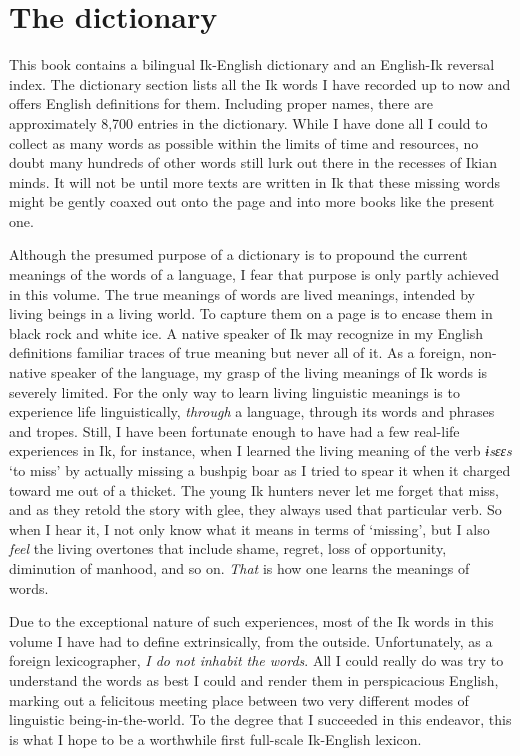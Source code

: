  
\section{The dictionary}\label{sec:1.2} 

This book contains a bilingual Ik-English dictionary and an English-Ik reversal index. The dictionary section lists all the Ik words I have recorded up to now and offers English definitions for them. Including proper names, there are approximately 8,700 entries in the dictionary. While I have done all I could to collect as many words as possible within the limits of time and resources, no doubt many hundreds of other words still lurk out there in the recesses of Ikian minds. It will not be until more texts are written in Ik that these missing words might be gently coaxed out onto the page and into more books like the present one. 

Although the presumed purpose of a dictionary is to propound the current meanings of the words of a language, I fear that purpose is only partly achieved in this volume. The true meanings of words are lived meanings, intended by living beings in a living world. To capture them on a page is to encase them in black rock and white ice. A native speaker of Ik may recognize in my English definitions familiar traces of true meaning but never all of it. As a foreign, non-native speaker of the language, my grasp of the living meanings of Ik words is severely limited. For the only way to learn living linguistic meanings is to experience life linguistically, \textit{through} a language, through its words and phrases and tropes. Still, I have been fortunate enough to have had a few real-life experiences in Ik, for instance, when I learned the living meaning of the verb \textit{ɨsɛɛs }‘to miss’ by actually missing a bushpig boar as I tried to spear it when it charged toward me out of a thicket. The young Ik hunters never let me forget that miss, and as they retold the story with glee, they always used that particular verb. So when I hear it, I not only know what it means in terms of ‘missing’, but I also \textit{feel} the living overtones that include shame, regret, loss of opportunity, diminution of manhood, and so on. \textit{That} is how one learns the meanings of words. 

Due to the exceptional nature of such experiences, most of the Ik words in this volume I have had to define extrinsically, from the outside. Unfortunately, as a foreign lexicographer, \textit{I do not inhabit the words}. All I could really do was try to understand the words as best I could and render them in perspicacious English, marking out a felicitous meeting place between two very different modes of linguistic being-in-the-world. To the degree that I succeeded in this endeavor, this is what I hope to be a worthwhile first full-scale Ik-English lexicon.

